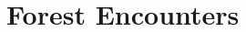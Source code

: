 \documentclass[a4paper,openany]{book}
\begin{document}
\renewcommand{\sqarea}{Town}

\begin{multicols}{2}

%







\stopcontents[sq]

\end{multicols}



\begin{multicols}{2}


%

%

%

%


\end{multicols}

\section{Forest Encounters}


\renewcommand{\sqarea}{Forest}

\begin{multicols}{2}

%

%

%

\end{multicols}


\backmatter

\printglossary[
  type=symbols,
  ]

\printindex
\end{document}
